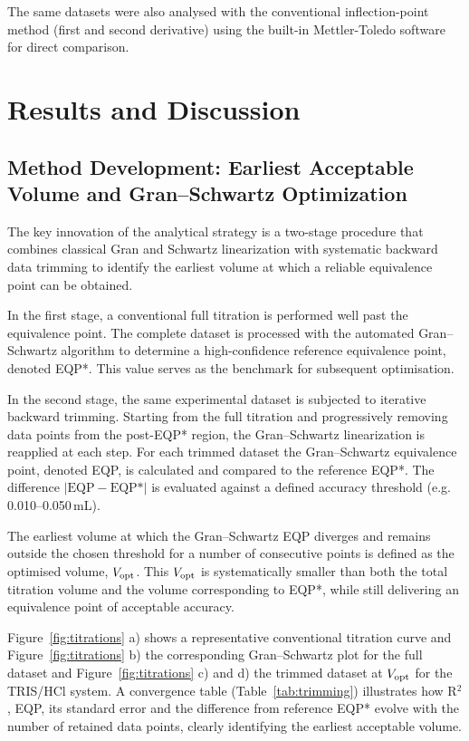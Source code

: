 \documentclass[twoside,twocolumn,9pt]{article}
\begin{document}
The same datasets were also analysed with the conventional inflection-point method (first and second derivative) using the built-in Mettler-Toledo software for direct comparison.

\section*{Results and Discussion}

\subsection*{Method Development: Earliest Acceptable Volume and Gran--Schwartz Optimization}

The key innovation of the analytical strategy is a two-stage procedure that combines classical Gran and Schwartz linearization with systematic backward data trimming to identify the earliest volume at which a reliable equivalence point can be obtained. 

In the first stage, a conventional full titration is performed well past the equivalence point.
The complete dataset is processed with the automated Gran--Schwartz algorithm to determine a high-confidence reference equivalence point, denoted EQP*.
This value serves as the benchmark for subsequent optimisation.

In the second stage, the same experimental dataset is subjected to iterative backward trimming.
Starting from the full titration and progressively removing data points from the post-EQP* region, the Gran--Schwartz linearization is reapplied at each step.
For each trimmed dataset the Gran--Schwartz equivalence point, denoted EQP, is calculated and compared to the reference EQP*.
The difference $|\text{EQP} - \text{EQP*}|$ is evaluated against a defined accuracy threshold (e.g. 0.010--0.050\,mL). 

The earliest volume at which the Gran--Schwartz EQP diverges and remains outside the chosen threshold for a number of consecutive points is defined as the optimised volume, $V_{\rm opt}$.
This $V_{\rm opt}$ is systematically smaller than both the total titration volume and the volume corresponding to EQP*, while still delivering an equivalence point of acceptable accuracy.

Figure~\ref{fig:titrations} a) shows a representative conventional titration curve and Figure~\ref{fig:titrations} b) the corresponding Gran--Schwartz plot for the full dataset and Figure~\ref{fig:titrations} c) and d) the trimmed dataset at $V_{\rm opt}$ for the TRIS/HCl system.
A convergence table (Table~\ref{tab:trimming}) illustrates how R$^2$, EQP, its standard error and the difference from reference EQP* evolve with the number of retained data points, clearly identifying the earliest acceptable volume.
\end{document}
